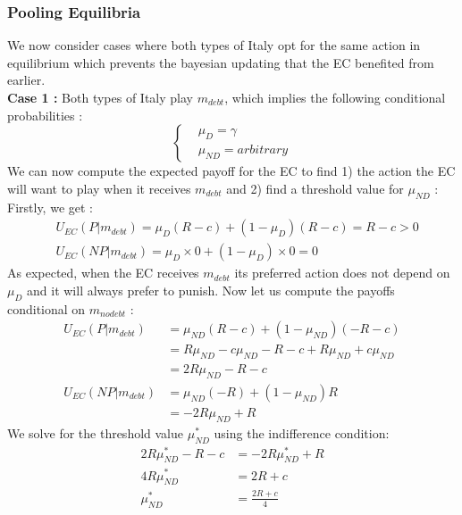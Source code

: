 \documentclass{article}
\begin{document}
\subsubsection{Pooling Equilibria}
We now consider cases where both types of Italy opt for the same action in equilibrium which prevents the bayesian updating that the EC benefited from earlier. \\
\indent \textbf{Case 1 : }
Both types of Italy play $m_{debt}$, which implies the following conditional probabilities : 
\begin{equation}
\left\{
\begin{aligned}
    &\mu_D = \gamma\\
    &\mu_{ND}=arbitrary
\end{aligned}
\right.
\end{equation}
We can now compute the expected payoff for the EC to find 1) the action the EC will want to play when it receives $m_{debt}$ and 2) find a threshold value for $\mu_{ND}$ :\\
Firstly, we get :
\begin{equation}
\begin{aligned}
    &U_{EC}(P|m_{debt})=\mu_D(R-c)+(1-\mu_D)(R-c)=R-c>0\\
    &U_{EC}(NP|m_{debt})=\mu_D\times0+(1-\mu_D)\times0=0
\end{aligned}
\end{equation}
As expected, when the EC receives $m_{debt}$ its preferred action does not depend on $\mu_D$ and it will always prefer to punish. Now let us compute the payoffs conditional on $m_{nodebt}$ : 
\begin{equation}
\begin{aligned}
    U_{EC}(P|m_{debt})&=\mu_{ND}(R-c)+(1-\mu_{ND})(-R-c)\\
    &=R\mu_{ND}-c\mu_{ND}-R-c+R\mu_{ND}+c\mu_{ND}\\
    &=2R\mu_{ND}-R-c\\
    U_{EC}(NP|m_{debt})&= \mu_{ND}(-R)+(1-\mu_{ND})R\\
    &=-2R\mu_{ND}+R
\end{aligned}
\end{equation}
We solve for the threshold value $\mu_{ND}^*$ using the indifference condition:
\begin{equation}
\begin{aligned}
    2R\mu_{ND}^*-R-c&=-2R\mu_{ND}^*+R\\
    4R\mu_{ND}^*&=2R+c\\
    \mu_{ND}^*&=\frac{2R+c}{4}
\end{aligned}
\end{equation}
\end{document}
